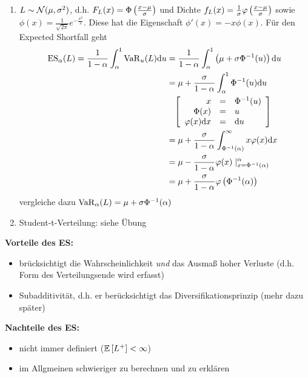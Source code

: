 \begin{*beispiel}
	\begin{enumerate}
		\item $L \sim \mathcal{N}(\mu, \sigma^2)$, d.h. $F_L(x) = \Phi\left( \frac{x-\mu}{\sigma} \right)$ und Dichte $f_L(x) = \frac{1}{\sigma} \varphi\left( \frac{x-\mu}{\sigma} \right)$ sowie $\phi(x) = \frac{1}{\sqrt{2\pi}} e^{-\frac{x^2}{2}}$. Diese hat die Eigenschaft $\phi'(x) = -x \phi(x)$. Für den Expected Shortfall geht
		\begin{equation*}
		\begin{aligned}
			\operatorname{ES}_\alpha(L) 
			= \frac{1}{1-\alpha} \int_\alpha^1 \operatorname{VaR}_u(L) \mathrm{d}{u} 
			&= \frac{1}{1-\alpha} \int_\alpha^1 \left( \mu + \sigma \Phi^{-1}(u) \right) \mathrm{d}{u} \\
			&= \mu + \frac{\sigma}{1-\alpha} \int_\alpha^1 \Phi^{-1}(u) \mathrm{d}{u} \\
			&\phantom{=} \left[ \begin{array}{rcl}
			x &=& \Phi^{-1}(u) \\ \Phi(x) &=& u \\ \varphi(x) \mathrm{d}{x} &=& \mathrm{d}{u}
			\end{array} \right]  \\
			&= \mu + \frac{\sigma}{1-\alpha} \int_{\Phi^{-1}(\alpha)}^\infty x \varphi(x) \mathrm{d}{x} \\
			&= \mu - \frac{\sigma}{1-\alpha} \varphi(x) \mid_{x = \Phi^{-1}(\alpha)}^\alpha \\
			&= \mu + \frac{\sigma}{1-\alpha} \varphi\left( \Phi^{-1}(\alpha) \right)
		\end{aligned} 
		\end{equation*} 
		vergleiche dazu $\operatorname{VaR}_\alpha(L) = \mu + \sigma \Phi^{-1}(\alpha)$
		\item Student-t-Verteilung: siehe Übung
	\end{enumerate}
\end{*beispiel}

\textbf{Vorteile des ES:}
\begin{itemize}[nolistsep, topsep=-\parskip]
	\item brücksichtigt die Wahrscheinlichkeit \textit{und} das Ausmaß hoher Verluste (d.h. Form des Verteilungsende wird erfasst)
	\item Subadditivität, d.h. er berücksichtigt das Diversifikationsprinzip (mehr dazu später)
\end{itemize}

\vspace{\parskip}

\textbf{Nachteile des ES:}
\begin{itemize}[nolistsep, topsep=-\parskip]
	\item nicht immer definiert ($\mathbb{E} \left[ L^+ \right] < \infty$) 
	\item im Allgmeinen schwieriger zu berechnen und zu erklären
\end{itemize}